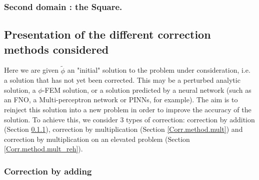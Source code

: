 \subsubsection{Second domain : the Square.} \label{Corr.pb.square}

\subsection{Presentation of the different correction methods considered} \label{Corr.methods}


Here we are given $\tilde{\phi}$ an "initial" solution to the problem under consideration, i.e. a solution that has not yet been corrected. This may be a perturbed analytic solution, a $\phi$-FEM solution, or a solution predicted by a neural network (such as an FNO, a Multi-perceptron network or PINNs, for example). The aim is to reinject this solution into a new problem in order to improve the accuracy of the solution. To achieve this, we consider 3 types of correction: correction by addition (Section \ref{Corr.method.add}), correction by multiplication (Section \ref{Corr.method.mult}) and correction by multiplication on an elevated problem (Section \ref{Corr.method.mult_reh}).

\subsubsection{Correction by adding} \label{Corr.method.add}

